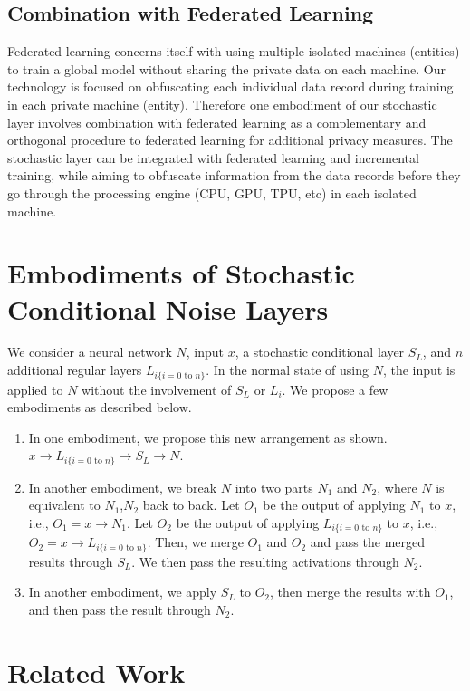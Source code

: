 \documentclass[12pt, letterpaper]{article}
\begin{document}
\subsection{Combination with Federated Learning}
Federated learning concerns itself with using multiple isolated machines (entities) to train a global model without sharing the private data on each machine. Our technology is focused on obfuscating each individual data record during training in each private machine (entity). Therefore one embodiment of our stochastic layer involves combination with federated learning as a complementary and orthogonal procedure to federated learning for additional privacy measures.
The stochastic layer can be integrated with federated learning and incremental training, while aiming to obfuscate information from the data records before they go through the processing engine (CPU, GPU, TPU, etc) in each isolated machine. 

\section{Embodiments of Stochastic Conditional Noise Layers}
\label{sec:embodiments}
We consider a neural network $N$, input $x$, a stochastic conditional layer $S_L$, and $n$ additional regular layers $L_{i\text{\{$i=0$ to $n$\}}}$. In the normal state of using $N$, the input is applied to $N$ without the involvement of $S_L$ or $L_i$. We propose a few embodiments as described below.
\begin{enumerate}
    \item In one embodiment, we propose this new arrangement as shown. $x \rightarrow L_{i\text{\{$i=0$ to $n$\}}} \rightarrow S_L \rightarrow N$.
    \item In another embodiment, we break $N$ into two parts $N_1$ and $N_2$, where $N$ is equivalent to $N_1$,$N_2$ back to back. Let $O_1$ be the output of applying $N_1$ to $x$, i.e., $O_1 = x \rightarrow N_1$. Let $O_2$ be the output of applying $L_{i\text{\{$i=0$ to $n$\}}}$ to $x$, i.e., $O_2 = x \rightarrow L_{i\text{\{$i=0$ to $n$\}}}$. Then, we merge $O_1$ and $O_2$ and pass the merged results through $S_L$. We then pass the resulting activations through $N_2$.
    \item In another embodiment, we apply $S_L$ to $O_2$, then merge the results with $O_1$, and then pass the result through $N_2$.
    
\end{enumerate}

\section{Related Work}
\end{document}
